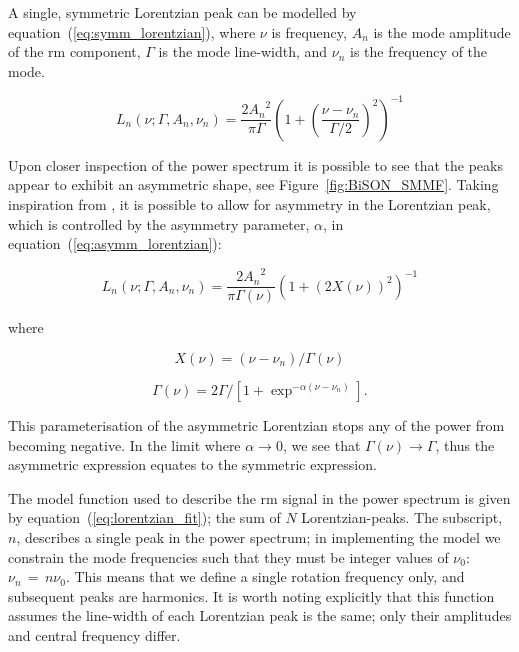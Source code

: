 A single, symmetric Lorentzian peak can be modelled by equation~(\ref{eq:symm_lorentzian}), where $\nu$ is frequency, $A_n$ is the mode amplitude of the \gls{rm} component, $\Gamma$ is the mode line-width, and $\nu_n$ is the frequency of the mode.

\begin{equation}
L_n(\nu; \Gamma, A_n, \nu_n) = \frac{2{A_n}^2}{\pi \Gamma} \left(1 + \left(\frac{\nu - \nu_{n}}{\Gamma /2}\right)^2\right)^{-1} 
\label{eq:symm_lorentzian}
\end{equation}

Upon closer inspection of the power spectrum it is possible to see that the peaks appear to exhibit an asymmetric shape, see Figure~\ref{fig:BiSON_SMMF}. Taking inspiration from \citep{howe_solar_2020}, it is possible to allow for asymmetry in the Lorentzian peak, which is controlled by the asymmetry parameter, $\alpha$, in equation~(\ref{eq:asymm_lorentzian}):

\begin{equation}
L_n(\nu; \Gamma, A_n, \nu_n) = \frac{2{A_n}^2}{\pi \Gamma(\nu)} \left(1 + \left(2X(\nu)\right)^2\right)^{-1} 
\label{eq:asymm_lorentzian}
\end{equation}

where

\begin{equation}
X(\nu) = (\nu - \nu_n)/\Gamma(\nu)
\label{eq:asymm_freq}
\end{equation}

\begin{equation}
\Gamma(\nu) = 2\Gamma / [1 + \exp^{-\alpha(\nu - \nu_n)}] .
\label{eq:asymm_width}
\end{equation}

This parameterisation of the asymmetric Lorentzian stops any of the power from becoming negative. In the limit where $\alpha \rightarrow 0$, we see that $\Gamma(\nu) \rightarrow \Gamma$, thus the asymmetric expression equates to the symmetric expression.

The model function used to describe the \gls{rm} signal in the power spectrum is given by equation~(\ref{eq:lorentzian_fit}); the sum of $N$ Lorentzian-peaks. The subscript, $n$, describes a single peak in the power spectrum; in implementing the model we constrain the mode frequencies such that they must be integer values of $\nu_0$: $\nu_n \, = \, n \nu_0$. This means that we define a single rotation frequency only, and subsequent peaks are harmonics. It is worth noting explicitly that this function assumes the line-width of each Lorentzian peak is the same; only their amplitudes and central frequency differ.

